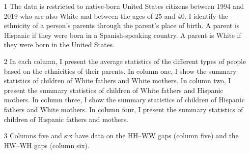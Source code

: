 \begin{table}[H]
{\begin{threeparttable}
\begin{tabular}[t]{lcccccc}
\bottomrule
\end{tabular}
\begin{tablenotes}
\item[1] The data is restricted to native-born United States citizens between 1994 and 2019 who are also White and between the ages of 25 and 40. I identify the ethnicity of a person's parents through the parent's place of birth. A parent is Hispanic if they were born in a Spanish-speaking country. A parent is White if they were born in the United States.
\item[2] In each column, I present the average statistics of the different types of people based on the ethnicities of their parents. In column one, I show the summary statistics of children of White fathers and White mothers. In column two, I present the summary statistics of children of White fathers and Hispanic mothers. In column three, I show the summary statistics of children of Hispanic fathers and White mothers. In column four, I present the summary statistics of children of Hispanic fathers and mothers.
\item[3] Columns five and six have data on the HH--WW gaps (column five) and the HW--WH gaps (column six).
\end{tablenotes}
\end{threeparttable}}
\end{table}
